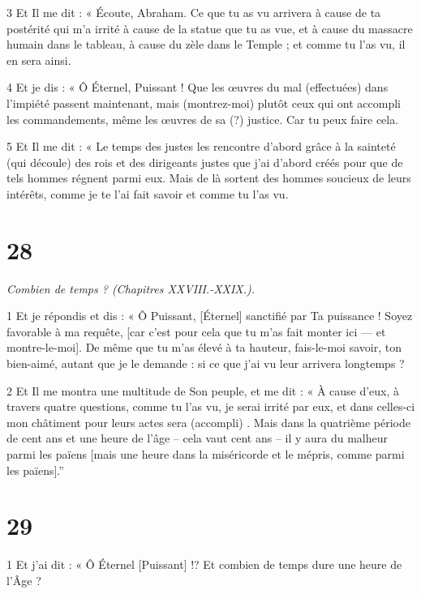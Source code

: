\par 3 Et Il me dit : « Écoute, Abraham. Ce que tu as vu arrivera à cause de ta postérité qui m'a irrité à cause de la statue que tu as vue, et à cause du massacre humain dans le tableau, à cause du zèle dans le Temple ; et comme tu l’as vu, il en sera ainsi.

\par 4 Et je dis : « Ô Éternel, Puissant ! Que les œuvres du mal (effectuées) dans l'impiété passent maintenant, mais (montrez-moi) plutôt ceux qui ont accompli les commandements, même les œuvres de sa (?) justice. Car tu peux faire cela.

\par 5 Et Il me dit : « Le temps des justes les rencontre d'abord grâce à la sainteté (qui découle) des rois et des dirigeants justes que j'ai d'abord créés pour que de tels hommes régnent parmi eux. Mais de là sortent des hommes soucieux de leurs intérêts, comme je te l'ai fait savoir et comme tu l'as vu.

\chapter{28}

\par \textit{Combien de temps ? (Chapitres XXVIII.-XXIX.).}

\par 1 Et je répondis et dis : « Ô Puissant, [Éternel] sanctifié par Ta puissance ! Soyez favorable à ma requête, [car c'est pour cela que tu m'as fait monter ici — et montre-le-moi]. De même que tu m'as élevé à ta hauteur, fais-le-moi savoir, ton bien-aimé, autant que je le demande : si ce que j'ai vu leur arrivera longtemps ?

\par 2 Et Il me montra une multitude de Son peuple, et me dit : « À cause d'eux, à travers quatre questions, comme tu l'as vu, je serai irrité par eux, et dans celles-ci mon châtiment pour leurs actes sera (accompli) . Mais dans la quatrième période de cent ans et une heure de l’âge – cela vaut cent ans – il y aura du malheur parmi les païens [mais une heure dans la miséricorde et le mépris, comme parmi les païens].”

\chapter{29}

\par 1 Et j'ai dit : « Ô Éternel [Puissant] !? Et combien de temps dure une heure de l’Âge ?

